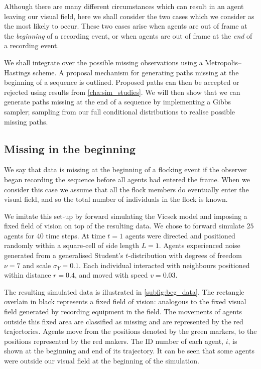 Although there are many different circumstances which can result in an agent
leaving our visual field, here we shall consider the two cases which we
consider as the most likely to occur. These two cases arise when agents are
out of frame at the \emph{beginning} of a recording event, or when
agents are out of frame at the \emph{end} of a recording event.

We shall integrate over the possible missing observations using a
Metropolis--Hastings scheme. A proposal mechanism for generating paths missing
at the beginning of a sequence is outlined. Proposed paths can then be accepted
or rejected using results from \cref{cha:sim_studies}. We will then show that
we can generate paths missing at the end of a sequence by implementing a Gibbs
sampler; sampling from our full conditional distributions to realise possible
missing paths.

\subsection{Missing in the beginning}

We say that data is missing at the beginning of a flocking event if the
observer began recording the sequence before all agents had entered the frame.
When we consider this case we assume that all the flock members do eventually
enter the visual field, and so the total number of individuals in the flock is
known.

We imitate this set-up by forward simulating the Vicsek model and imposing a
fixed field of vision on top of the resulting data. We chose to forward
simulate $25$ agents for $40$ time steps. At time $t=1$ agents were directed
and positioned randomly within a square-cell of side length $L=1$. Agents
experienced noise generated from a generalised Student's $t$-distribution with
degrees of freedom $\nu=7$ and scale $\sigma_Y=0.1$. Each individual interacted
with neighbours positioned within distance $r=0.4$, and moved with speed
$v=0.03$.

The resulting simulated data is illustrated in \cref{subfig:beg_data}. The
rectangle overlain in black represents a fixed field of vision: analogous to
the fixed visual field generated by recording equipment in the field. The
movements of agents outside this fixed area are classified as missing and are
represented by the red trajectories. Agents move from the positions denoted by
the green markers, to the positions represented by the red makers. The ID
number of each agent, $i$, is shown at the beginning and end of its trajectory.
It can be seen that some agents were outside our visual field at the beginning
of the simulation. 

